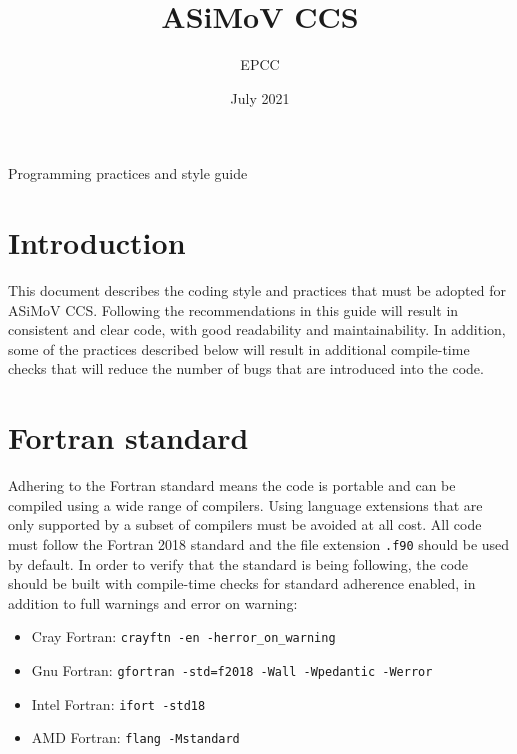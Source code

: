 \documentclass[11pt]{article}
\begin{document}
\lstset{style=codefragment}


\title{ASiMoV CCS}

\date{July 2021}
\author{EPCC}

\makeEPCCtitle

\centerline{\sc Programming practices and style guide}

\tableofcontents
\pagebreak

\bigskip


\bigskip


\section{Introduction}
This document describes the coding style and practices that must be adopted for ASiMoV CCS. Following the recommendations
in this guide will result in consistent and clear code, with good readability and maintainability. In addition, 
some of the practices described below will result in additional compile-time checks that will reduce the number of 
bugs that are introduced into the code.

\section{Fortran standard}
Adhering to the Fortran standard means the code is portable and can be compiled using a wide range of compilers. 
Using language extensions that are only supported by a subset of compilers must be avoided at all cost. All code 
must follow the Fortran 2018 standard and the file extension \texttt{.f90} should be used by default. In order to 
verify that the standard is being following, the code should be built with compile-time checks for standard 
adherence enabled, in addition to full warnings and error on warning:
\begin{itemize}
\item Cray Fortran: \texttt{crayftn -en -herror_on_warning}
\item Gnu Fortran: \texttt{gfortran -std=f2018 -Wall -Wpedantic -Werror}
\item Intel Fortran: \texttt{ifort -std18}
\item AMD Fortran: \texttt{flang -Mstandard}
\end{itemize}
\end{document}
